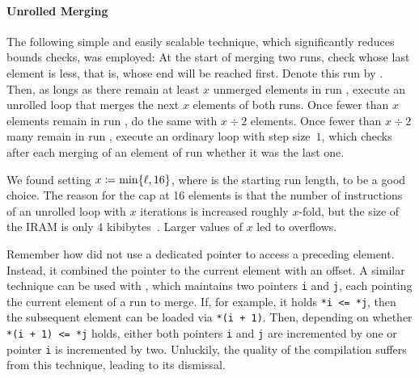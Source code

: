 \paragraph{Unrolled Merging}
\label{sec:tasklet:merge:unrolled merging}
The following simple and easily scalable technique, which significantly reduces bounds checks, was employed:
At the start of merging two runs, check whose last element is less, that is, whose end will be reached first.
Denote this run by \runless{}.
Then, as longs as there remain at least \(x\) unmerged elements in run \runless{}, execute an unrolled loop that merges the next \(x\) elements of both runs.
Once fewer than \(x\) elements remain in run \runless{}, do the same with \(x \div 2\) elements.
Once fewer than \(x \div 2\) many remain in run \runless{}, execute an ordinary loop with step size~\(1\), which checks after each merging of an element of run \runless{} whether it was the last one.

We found setting \(x \coloneqq \min\{ \ell, 16 \}\), where \startingrun{} is the starting run length, to be a good choice.
The reason for the cap at 16 elements is that the number of instructions of an unrolled loop with \(x\) iterations is increased roughly \(x\)-fold, but the size of the IRAM is only 4 kibibytes~\cite[DPU Handbook -- Behaviours]{upmemSDK}.
Larger values of \(x\) led to overflows.

Remember how \IS{} did not use a dedicated pointer to access a preceding element.
Instead, it combined the pointer to the current element with an offset.
A similar technique can be used with \MS{}, which maintains two pointers \lstinline|i| and \lstinline|j|, each pointing the current element of a run to merge.
If, for example, it holds \lstinline|*i <= *j|, then the subsequent element can be loaded via \lstinline|*(i + 1)|.
Then, depending on whether \lstinline|*(i + 1) <= *j| holds, either both pointers \lstinline|i| and \lstinline|j| are incremented by one or pointer \lstinline|i| is incremented by two.
Unluckily, the quality of the compilation suffers from this technique, leading to its dismissal.




